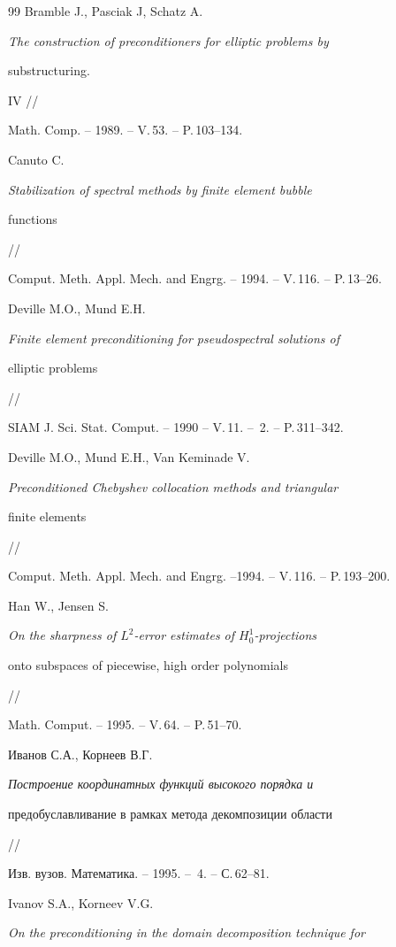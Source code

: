 \begin{thebibliography}{99}
Bramble J., Pasciak J, Schatz A.


{\it The construction of preconditioners for elliptic problems by


substructuring.} IV // 


Math. Comp. -- 1989. -- V.\,53. -- P.\,103--134.




Canuto C.


{\it Stabilization of spectral methods by finite element bubble


functions} //


Comput. Meth. Appl. Mech. and Engrg. -- 1994. -- V.\,116. -- P.\,13--26.




Deville M.O., Mund E.H.


{\it Finite element preconditioning for pseudospectral solutions of


elliptic problems} //


SIAM J. Sci. Stat. Comput. -- 1990 -- V.\,11. -- \No\,2. -- P.\,311--342.




Deville M.O., Mund E.H., Van Keminade V.


{\it Preconditioned Chebyshev collocation methods and triangular


finite elements} //


Comput. Meth. Appl. Mech. and Engrg. --1994. -- V.\,116. -- P.\,193--200.




Han W., Jensen S.


{\it On the sharpness of $L^2$-error estimates of $H^1_0$-projections


onto subspaces of piecewise, high order polynomials} //


Math. Comput. -- 1995. -- V.\,64. -- P.\,51--70.




Иванов С.А., Корнеев В.Г.


{\it Построение координатных функций высокого порядка и


предобуславливание в рамках метода декомпозиции области} //


Изв. вузов. Математика. -- 1995. -- \No\,4. -- С.\,62--81.




Ivanov S.A., Korneev V.G.


{\it On the preconditioning in the domain decomposition technique for


}
\end{thebibliography}
